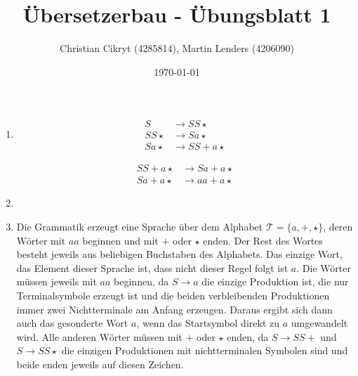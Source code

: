 \documentclass[a4paper,10pt]{scrartcl}
\title{Übersetzerbau - Übungsblatt 1}
\author{Christian Cikryt (4285814), Martin Lenders (4206090)}
\date{\today}
\begin{document}
\maketitle

\section{}
\begin{enumerate}
 \item	\begin{minipage}[t]{0.4\textwidth}
	  \begin{align*}
	    S & \to SS\star \tag{$S \to SS\star$} \\
	    SS\star & \to Sa\star \tag{$S \to a$} \\
	    Sa\star & \to SS+a\star \tag{$S \to SS+$}
	  \end{align*}
	\end{minipage}
	\begin{minipage}[t]{0.4\textwidth}
	  \begin{align*}
	    SS+a\star & \to Sa+a\star \tag{$S \to a$} \\
	    Sa+a\star & \to aa+a\star \tag{$S \to a$}
	  \end{align*}
	\end{minipage}
 \item	\begin{minipage}[t]{0.8\textwidth}
	  \centering
	\end{minipage}
 \item	Die Grammatik erzeugt eine Sprache über dem Alphabet $\mathcal{T} = \{a,
	+, \star\}$, deren Wörter mit $aa$ beginnen und mit $+$ oder $\star$
  enden.
	Der Rest des Wortes besteht jeweils aus beliebigen Buchstaben des
  Alphabets.
	Das einzige Wort, das Element dieser Sprache ist, dass nicht dieser
Regel folgt ist $a$.
	Die Wörter müssen jeweils mit $aa$ beginnen, da $S \to a$ die einzige
	Produktion ist, die nur Terminalsymbole erzeugt ist und die beiden
	verbleibenden Produktionen immer zwei Nichtterminale am Anfang erzeugen.
	Daraus ergibt sich dann auch das gesonderte Wort $a$, wenn das
Startsymbol direkt zu $a$ umgewandelt wird. 
	Alle anderen Wörter müssen mit $+$ oder $\star$ enden, da $S \to SS+$
und $S \to SS\star$ die einzigen Produktionen mit nichtterminalen Symbolen sind
 und beide enden jeweils auf diesen Zeichen.
\end{enumerate}
\end{document}
